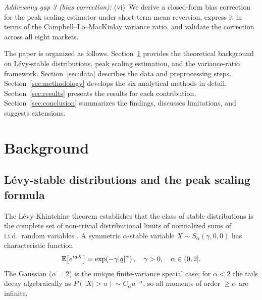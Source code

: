 \documentclass[12pt,a4paper]{article}
\begin{document}
\textit{Addressing gap 3 (bias correction):}
(vi)~We derive a closed-form bias correction for the peak scaling estimator
under short-term mean reversion, express it in terms of the
Campbell--Lo--MacKinlay variance ratio, and validate the correction across
all eight markets.

The paper is organized as follows. Section~\ref{sec:background} provides
the theoretical background on Lévy-stable distributions, peak scaling
estimation, and the variance-ratio framework. Section~\ref{sec:data} describes
the data and preprocessing steps. Section~\ref{sec:methodology} develops the
six analytical methods in detail. Section~\ref{sec:results} presents the
results for each contribution. Section~\ref{sec:conclusion} summarizes the
findings, discusses limitations, and suggests extensions.


\section{Background}
\label{sec:background}

\subsection{Lévy-stable distributions and the peak scaling formula}
\label{sec:background:levy}

The Lévy-Khintchine theorem establishes that the class of stable distributions
is the complete set of non-trivial distributional limits of normalized sums of
i.i.d.\ random variables \cite{SamorodTaqqu1994,GnedenkoKolmogorov1954}.
A symmetric $\alpha$-stable variable $X \sim S_\alpha(\gamma,0,0)$ has
characteristic function
\begin{equation}
  \mathbb{E}\!\left[e^{iqX}\right] = \exp\!\left(-\gamma|q|^\alpha\right),
  \quad \gamma > 0,\quad \alpha \in (0,2].
  \label{eq:cf}
\end{equation}
The Gaussian ($\alpha = 2$) is the unique finite-variance special case; for
$\alpha < 2$ the tails decay algebraically as $P(|X|>u)\sim C_\alpha u^{-\alpha}$,
so all moments of order $\geq\alpha$ are infinite.
\end{document}
